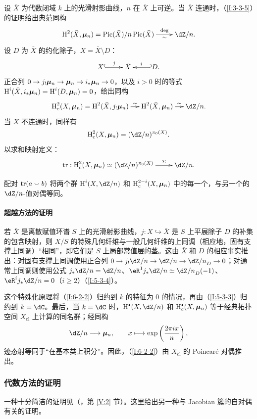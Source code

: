 \subsubsection{}\label{I:6-2-1}
设 $\bar X$ 为代数闭域 $k$ 上的光滑射影曲线，$n$ 在 $\bar X$ 上可逆。当 $\bar X$ 连通时，（\ref{I:3-3-5}）的证明给出典范同构
\[\xymatrix{
\h^2(\bar X,\dmu_n)=\pic(\bar X)/n\pic(\bar X)\ar[r]^-{\deg}_-\sim&\dZ/n.
}\]
设 $D$ 为 $\bar X$ 的约化除子，$X=\bar X\setminus D$：
\[\xymatrix{
X\ar@{^{(}->}[r]^-j&\bar X&\ar@{_{(}->}[l]_-iD.
}\]
正合列 $0\to j_!{\bm\mu}_n\to{\bm\mu}_n\to i_*{\bm\mu}_n\to0$，以及 $i>0$ 时的等式 $\operatorname{H}^i(\bar X,i_*{\bm\mu}_n)=\operatorname{H}^i(D,{\bm\mu}_n)=0$，给出同构
\[\xymatrix@C=12pt{
\h_c^2(X,\dmu_n)=\h^2(\bar X,j_!\dmu_n)\ar[r]^-\sim&\h^2(\bar X,\dmu_n)\ar[r]^-\sim&\dZ/n.
}\]
当 $\bar X$ 不连通时，同样有
\[
\h_c^2(X,\dmu_n)=(\dZ/n)^{\pi_0(X)}.
\]
以求和映射定义：
\[\xymatrix{
\tr:\h_c^2(X,\dmu_n)\simeq(\dZ/n)^{\pi_0(X)}\ar[r]^-\Sigma&\dZ/n.
}\]
\begin{theorem}\label{I:6-2-2}
配对 $\operatorname{tr}(a\smallsmile b)$ 将两个群 $\h^i(X,\dZ/n)$ 和 $\operatorname{H}_c^{2-i}(X,{\bm\mu}_n)$ 中的每一个，与另一个的 $\dZ/n$-值对偶等同。
\end{theorem}
\paragraph{超越方法的证明}
若 $\bar X$ 是离散赋值环谱 $S$ 上的光滑射影曲线，$j:X\hookrightarrow\bar X$ 是 $S$ 上平展除子 $D$ 的补集的包含映射，则 $X/S$ 的特殊几何纤维与一般几何纤维的上同调（相应地，固有支撑上同调）“相同”，即它们是 $S$ 上局部常值层的茎。这由 $\bar X$ 和 $D$ 的相应事实推出：对固有支撑上同调使用正合列 $0\to j_!\dZ/n\to\dZ/n\to{\dZ/n}_D\to0$；对通常上同调则使用公式 $j_*\dZ/n=\dZ/n$、$\eR^1j_*\dZ/n\simeq{\dZ/n}_D(-1)$、$\eR^ij_*\dZ/n=0$（$i\geqslant2$）（\ref{I:5-3-4}）。

这个特殊化原理将（\ref{I:6-2-2}）归约到 $k$ 的特征为 $0$ 的情况，再由（\ref{I:5-3-3}）归约到 $k=\dC$。最后，当 $k=\dC$ 时，$\h^\bullet(X,\dZ/n)$ 和 $\h_c^\bullet(X,\dmu_n)$ 等于经典拓扑空间 $X_{\mathrm{cl}}$ 上计算的同名群；经同构
\[
\dZ/n\longrightarrow\dmu_n,\qquad x\longmapsto\exp\left(\frac{2\pi ix}{n}\right),
\]
迹态射等同于“在基本类上积分”。因此，（\ref{I:6-2-2}）由 $X_{\mathrm{cl}}$ 的 Poincaré 对偶推出。
\subsubsection{代数方法的证明}\label{I:6-2-3}
一种十分简洁的证明见（，第 \ref{V:2} 节）。这里给出另一种与 Jacobian 簇的自对偶有关的证明。


